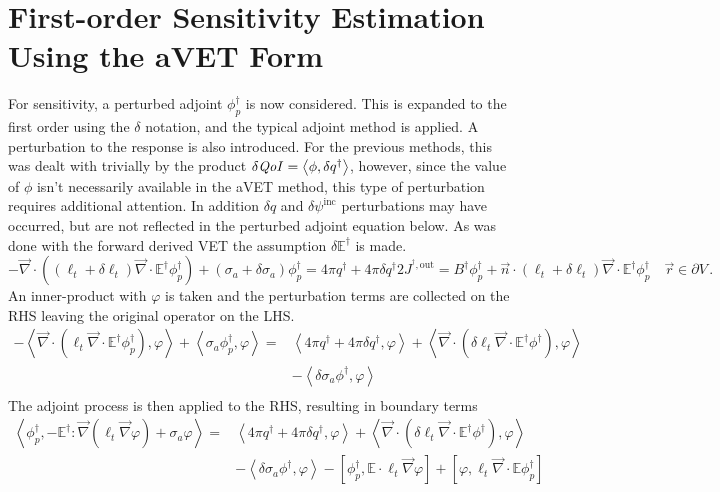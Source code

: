 \documentclass[12pt]{report}
\newcommand{\vr}{\vec{r}}
\newcommand{\bra}{\left\langle}
\newcommand{\ket}{\right\rangle}
\newcommand{\sbra}{\left[}
\newcommand{\sket}{\right]}
\renewcommand{\div}{\vec{\nabla} \cdot}
\newcommand{\grad}{\vec{\nabla}}
\newcommand{\bound}{\partial V}
\newcommand{\vn}{\vec{n}}
\newcommand{\Edd}{\mathbb{E}}
\newcommand{\BEdd}{B}
\newcommand{\siga}{\sigma_a}
\newcommand{\isigt}{\ell_t}
\newcommand{\scalResp}{q^\dag}
\newcommand{\qoi}{{\it QoI}\xspace}
\begin{document}
\section{First-order Sensitivity Estimation Using the aVET Form}
For sensitivity, a perturbed adjoint $\phi^\dag_p$ is now considered. This is expanded to the first order using the $\delta$ notation, and the typical adjoint method is applied. A perturbation to the response is also introduced. For the previous methods, this was dealt with trivially by the product $\delta \qoi = \bra \phi , \delta q^\dag \ket$, however, since the value of $\phi$ isn't necessarily available in the aVET method, this type of perturbation requires additional attention. In addition $\delta q$ and $\delta \psi^{\text{inc}}$ perturbations may have occurred, but are not reflected in the perturbed adjoint equation below. As was done with the forward derived VET the assumption $\delta \Edd^\dag$ is made.
\begin{subequations}
\begin{equation}
- \div \left( (\isigt + \delta \isigt )\div \Edd^\dag \phi^\dag_p  \right)  +  (\siga + \delta \siga) \phi^\dag_p  =  4 \pi \scalResp + 4 \pi\delta \scalResp
\end{equation}
\begin{equation}
2 J^{^\dag,\text{out}} = \BEdd^\dag \phi^\dag_p  + \vn \cdot (\isigt + \delta \isigt) \div \Edd^\dag  \phi^\dag_p \quad \vr \in \bound \, .
\end{equation}
\end{subequations}
An inner-product with $\varphi$ is taken and the perturbation terms are collected on the RHS leaving the original operator on the LHS.
\begin{equation}
\begin{split}
- \bra\div \left( \isigt \div \Edd^\dag \phi^\dag_p  \right), \varphi \ket + \bra \siga  \phi^\dag_p , \varphi \ket  =& \bra 4 \pi \scalResp + 4 \pi\delta \scalResp , \varphi \ket + \bra\div \left( \delta \isigt \div \Edd^\dag \phi^\dag  \right), \varphi \ket \\ 
&- \bra \delta \siga \phi^\dag , \varphi \ket \\
\end{split}
\end{equation}
The adjoint process is then applied to the RHS, resulting in boundary terms
\begin{equation}
\label{AltVetPertDeriv}
\begin{split}
 \bra  \phi^\dag_p , -\Edd^\dag : \grad \left( \isigt \grad \varphi \right) + \siga  \varphi \ket  =& \bra 4 \pi \scalResp + 4 \pi\delta \scalResp , \varphi \ket + \bra\div \left( \delta \isigt \div \Edd^\dag \phi^\dag  \right), \varphi \ket \\ 
&- \bra \delta \siga \phi^\dag , \varphi \ket - \sbra \phi^\dag_p, \Edd \cdot \isigt \grad \varphi \sket + \sbra \varphi, \isigt \div \Edd \phi^\dag_p \sket  \\
\end{split}
\end{equation}
\end{document}
